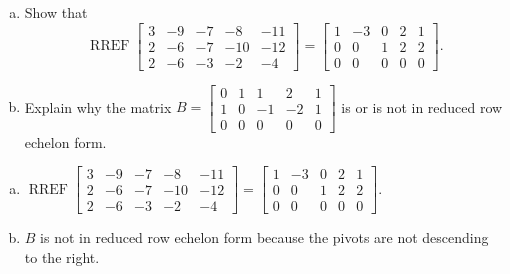 
\begin{exerciseStatement}

\begin{enumerate}[(a)]
\item Show that \[\operatorname{RREF} \left[\begin{array}{ccccc}
3 & -9 & -7 & -8 & -11 \\
2 & -6 & -7 & -10 & -12 \\
2 & -6 & -3 & -2 & -4
\end{array}\right] = \left[\begin{array}{ccccc}
1 & -3 & 0 & 2 & 1 \\
0 & 0 & 1 & 2 & 2 \\
0 & 0 & 0 & 0 & 0
\end{array}\right] .\]
\item Explain why the matrix \(B= \left[\begin{array}{ccccc}
0 & 1 & 1 & 2 & 1 \\
1 & 0 & -1 & -2 & 1 \\
0 & 0 & 0 & 0 & 0
\end{array}\right] \) is or is not in reduced row echelon form.
\end{enumerate}
    
\end{exerciseStatement}
    
\begin{exerciseAnswer} 

\begin{enumerate}[(a)]
\item \(\operatorname{RREF} \left[\begin{array}{ccccc}
3 & -9 & -7 & -8 & -11 \\
2 & -6 & -7 & -10 & -12 \\
2 & -6 & -3 & -2 & -4
\end{array}\right] = \left[\begin{array}{ccccc}
1 & -3 & 0 & 2 & 1 \\
0 & 0 & 1 & 2 & 2 \\
0 & 0 & 0 & 0 & 0
\end{array}\right] .\)
\item \(B\) is not in reduced row echelon form because the pivots are not descending to the right. 
\end{enumerate}
    
\end{exerciseAnswer}
    
